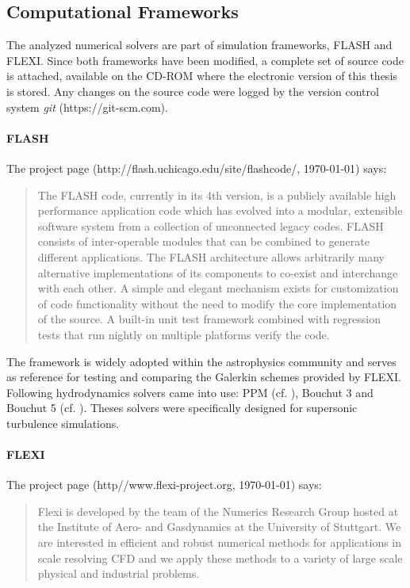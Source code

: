\subsection{Computational Frameworks}
\label{sec:computational-frameworks}
The analyzed numerical solvers are part of simulation frameworks, FLASH and
FLEXI. Since both frameworks have been modified, a complete set of source code
is attached, available on the CD-ROM where the electronic version of this
thesis is stored.  Any changes on the source code were logged by the version
control system \emph{git} (https://git-scm.com).

\paragraph{FLASH}
The project page (http://flash.uchicago.edu/site/flashcode/, \today) says:
\begin{quote}
The FLASH code, currently in its 4th version, is a publicly available high
performance application code which has evolved into a modular, extensible
software system from a collection of unconnected legacy codes. FLASH consists
of inter-operable modules that can be combined to generate different
applications. The FLASH architecture allows arbitrarily many alternative
implementations of its components to co-exist and interchange with each other.
A simple and elegant mechanism exists for customization of code functionality
without the need to modify the core implementation of the source. A built-in
unit test framework combined with regression tests that run nightly on multiple
platforms verify the code. 
\end{quote}

The framework is widely adopted within the astrophysics community and serves as
reference for testing and comparing the Galerkin schemes provided by FLEXI.
Following hydrodynamics solvers came into use: PPM (cf.
\cite{colella1984piecewise}), Bouchut 3 and Bouchut 5 (cf.
\cite{bouchut2007multiwave,bouchut2010multiwave}). Theses solvers were
specifically designed for supersonic turbulence simulations.

\paragraph{FLEXI}
The project page (http//www.flexi-project.org, \today) says:
\begin{quote}
Flexi is developed by the team of the Numerics Research Group hosted at the
Institute of Aero- and Gasdynamics at the University of Stuttgart. We are
interested in efficient and robust numerical methods for applications in scale
resolving CFD and we apply these methods to a variety of large scale
physical and industrial problems.
\end{quote}

